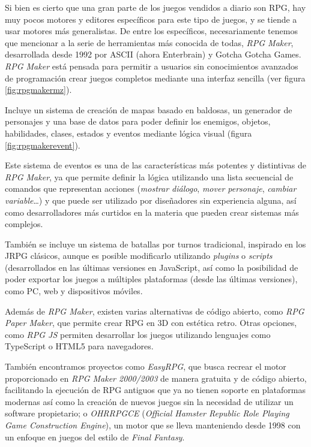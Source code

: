 Si bien es cierto que una gran parte de los juegos vendidos a diario son RPG, hay muy pocos motores y editores específicos para este tipo de juegos, y se tiende a usar motores más generalistas. De entre los específicos, necesariamente tenemos que mencionar a la serie de herramientas más conocida de todas, \textit{RPG Maker}, desarrollada desde 1992 por ASCII (ahora Enterbrain) y Gotcha Gotcha Games. \textit{RPG Maker} está pensada para permitir a usuarios sin conocimientos avanzados de programación crear juegos completos mediante una interfaz sencilla (ver figura \ref{fig:rpgmakermz}).

\smallskip

Incluye un sistema de creación de mapas basado en baldosas, un generador de personajes y una base de datos para poder definir los enemigos, objetos, habilidades, clases, estados y eventos mediante lógica visual (figura \ref{fig:rpgmakerevent}). 

\medskip

Este sistema de eventos es una de las características más potentes y distintivas de \textit{RPG Maker}, ya que permite definir la lógica utilizando una lista secuencial de comandos que representan acciones (\textit{mostrar diálogo}, \textit{mover personaje}, \textit{cambiar variable}\ldots) y que puede ser utilizado por diseñadores sin experiencia alguna, así como desarrolladores más curtidos en la materia que pueden crear sistemas más complejos.

\medskip

También se incluye un sistema de batallas por turnos tradicional, inspirado en los JRPG clásicos, aunque es posible modificarlo utilizando \textit{plugins} o \textit{scripts} (desarrollados en las últimas versiones en JavaScript, así como la posibilidad de poder exportar los juegos a múltiples plataformas (desde las últimas versiones), como PC, web y dispositivos móviles.

\bigskip

Además de \textit{RPG Maker}, existen varias alternativas de código abierto, como \textit{RPG Paper Maker}, que permite crear RPG en 3D con estética retro. Otras opciones, como \textit{RPG JS} permiten desarrollar los juegos utilizando lenguajes como TypeScript o HTML5 para navegadores.

\smallskip

También encontramos proyectos como \textit{EasyRPG}, que busca recrear el motor proporcionado en \textit{RPG Maker 2000/2003} de manera gratuita y de código abierto, facilitando la ejecución de RPG antiguos que ya no tienen soporte en plataformas modernas así como la creación de nuevos juegos sin la necesidad de utilizar un software propietario; o \textit{OHRRPGCE} (\textit{Official Hamster Republic Role Playing Game Construction Engine}), un motor que se lleva manteniendo desde 1998 con un enfoque en juegos del estilo de \textit{Final Fantasy}.